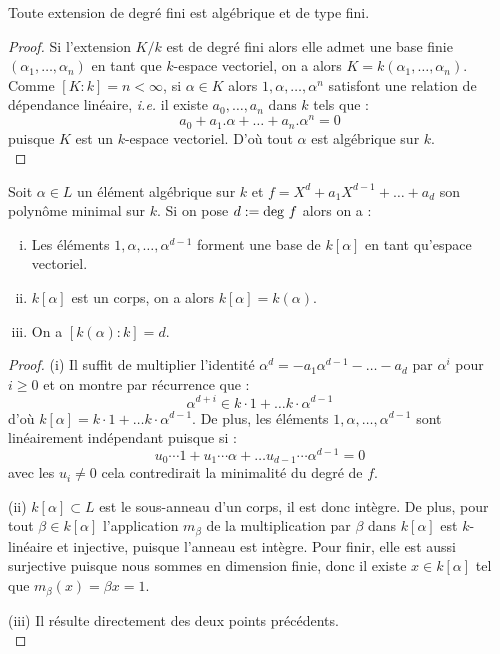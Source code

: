 \documentclass[a4paper]{article} %
\numberwithin{equation}{section}
\begin{document}
\begin{prop}
Toute extension de degré fini est algébrique et de type fini.
\end{prop}
\begin{proof}
Si l'extension $K/k$ est de degré fini alors elle admet une base finie 
$(\alpha_1,\dots,\alpha_n)$ en tant que $k$-espace vectoriel, on a alors $K 
= k(\alpha_1,\dots,\alpha_n)$. Comme $[K:k] = n < \infty$, si $\alpha\in K$ 
alors $1, \alpha, \dots, \alpha^n$ satisfont une relation de dépendance 
linéaire, \textit{i.e.} il existe $a_0, \dots, a_n$ dans $k$ tels que :
\[a_0 + a_1.\alpha + \dots + a_n.\alpha^n = 0\]
puisque $K$ est un $k$-espace vectoriel. D'où tout $\alpha$ est algébrique 
sur $k$.\\
\end{proof}

\begin{prop}
Soit $\alpha\in L$ un élément algébrique sur $k$ et $f = X^d + a_1X^{d-1} + 
\dots + a_d$ son polynôme minimal sur $k$. Si on pose $d := \textup{deg }f$ 
alors on a :
\begin{enumerate}[(i)]
\item Les éléments $1, \alpha,\dots,\alpha^{d-1}$ forment une base de 
$k[\alpha]$ en tant qu'espace vectoriel.
\item $k[\alpha]$ est un corps, on a alors $k[\alpha] = k(\alpha)$.
\item On a $[k(\alpha):k] = d$.
\end{enumerate}
\end{prop}

\begin{proof}
(i) Il suffit de multiplier l'identité $\alpha^d = -a_1\alpha^{d-1} - \dots 
- a_d$ par $\alpha^i$ pour $i\geq0$ et on montre par récurrence que :
\[\alpha^{d+i} \in k\cdot1 + \dots k\cdot\alpha^{d-1}\]
d'où $k[\alpha] = k\cdot1 + \dots k\cdot\alpha^{d-1}$. De plus, les éléments 
$1,\alpha,\dots,\alpha^{d-1}$ sont linéairement indépendant puisque si :
\[u_0\cdots1 + u_1\cdots\alpha + \dots u_{d-1}\cdots\alpha^{d-1} = 0\]
avec les $u_i\neq0$ cela contredirait la minimalité du degré de $f$.\par
(ii) $k[\alpha] \subset L$ est le sous-anneau d'un corps, il est donc intègre. 
De plus, pour tout $\beta\in k[\alpha]$ l'application $m_{\beta}$ de la 
multiplication par $\beta$ dans $k[\alpha]$ est $k$-linéaire et injective, 
puisque l'anneau est intègre. Pour finir, elle est aussi surjective puisque 
nous sommes en dimension finie, donc il existe $x\in k[\alpha]$ tel que 
$m_{\beta}(x) = \beta x = 1$.\par
(iii) Il résulte directement des deux points précédents.\\
\end{proof}
\end{document}
